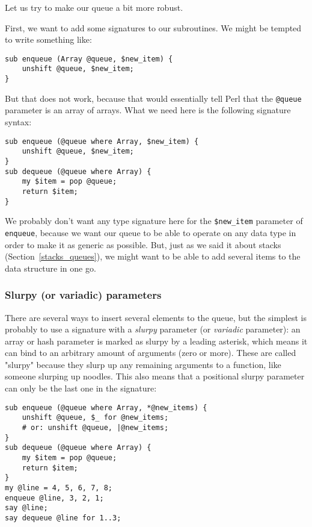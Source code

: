 Let us try to make our queue a bit more robust.

First, we want to add some signatures to our subroutines. We might be tempted to write something like:

\begin{verbatim}
sub enqueue (Array @queue, $new_item) {
    unshift @queue, $new_item;
}
\end{verbatim}

But that does not work, because that would essentially tell 
Perl that the \verb'@queue' parameter is an array of arrays. 
What we need here is the following signature syntax:

\begin{verbatim}
sub enqueue (@queue where Array, $new_item) {
    unshift @queue, $new_item;
}
sub dequeue (@queue where Array) {
    my $item = pop @queue;
    return $item;
}
\end{verbatim}

We probably don't want any type signature here for the 
\verb'$new_item' parameter of {\tt enqueue}, because we want 
our queue to be able to operate on any data type in order to 
make it as generic as possible. But, just as we said it 
about stacks (Section~\ref{stacks_queues}), we might want to 
be able to add several items to the data structure in one go. 

\subsubsection{Slurpy (or variadic) parameters}

\label{slurpy_params}
There are several ways to insert several elements to the 
queue, but the simplest is probably to use a signature with 
a \emph{slurpy} parameter (or \emph{variadic} parameter): 
an array or hash parameter is marked as slurpy by a leading 
asterisk, which means it can bind to an arbitrary amount 
of arguments (zero or more). These are called "slurpy" because 
they slurp up any remaining arguments to a function, like 
someone slurping up noodles. This also means that a positional 
slurpy parameter can only be the last one in the signature:

\begin{verbatim}
sub enqueue (@queue where Array, *@new_items) {
    unshift @queue, $_ for @new_items;
    # or: unshift @queue, |@new_items;
}
sub dequeue (@queue where Array) {
    my $item = pop @queue;
    return $item;
}
my @line = 4, 5, 6, 7, 8;
enqueue @line, 3, 2, 1;
say @line;
say dequeue @line for 1..3;
\end{verbatim}

